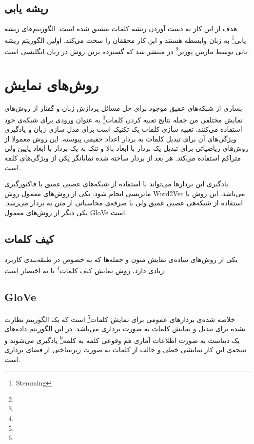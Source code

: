 \documentclass[12pt, a4paper, oneside]{report}
\begin{document}
\subsection{ریشه یابی}

هدف از این کار به دست آوردن ریشه کلمات مشتق شده است. الگوریتم‌های
ریشه یابی\footnote{Stemming}
به زبان وابسطه هستند و این کار محققان را سخت می‌کند. اولین الگوریتم
ریشه یابی
توسط
مارتین پورتر\footnote{}
در
\cite{porter1980algorithm}
منتشر شد که گسترده ترین روش در زبان انگلیسی است\cite{DBLP:journals/corr/AllahyariPASTGK17a}.


\section{روش‌های نمایش}

بساری از شبکه‌های عمیق موجود برای حل مسائل پردازش زبان و گفتار از روش‌های نمایش مختلفی من جمله نتایج
تعبیه کردن کلمات\footnote{}
به عنوان ورودی برای شبکه‌ی خود استفاده می‌کنند.
تعبیه سازی کلمات
یک تکنیک است برای مدل سازی زبان و یادگیری ویژگی‌های آن برای تبدیل کلمات به بردار اعداد حقیقی پیوسته.
این روش معمولا از روش‌های ریاضیاتی برای تبدیل یک بردار با ابعاد بالا و تنک به یک بردار با ابعاد پایین ولی متراکم استفاده می‌کند.
هر بعد از بردار ساخته شده نمایانگر یکی از ویژگی‌های کلمه است.

یادگیری این بردار‌ها می‌تواند با استفاده از شبکه‌های عصبی عمیق یا فاکتورگیری ماتریسی انجام شود. یکی از روش‌های معمول روش‌
Word2Vec
می‌باشد. این روش با استفاده از شبکه‌هی عصبی عمیق ولی با صرفه‌ی محاسباتی از متن به بردار می‌رسد. یکی دیگر از روش‌های معمول
GloVe
است.
\cite{zhang2018deep}

\subsection{کیف کلمات}

یکی از روش‌های ساده‌ی نمایش متون و جمله‌ها که به خصوص در طبقه‌بندی کاربرد زیادی دارد، روش نمایش
کیف کلمات\footnote{}
یا به اختصار
است.

\subsection{GloVe}

خلاصه شده‌ی 
بردارهای عمومی برای نمایش کلمات\footnote{}
است که یک الگوریتم نظارت نشده برای تبدیل و نمایش کلمات به صورت برداری می‌باشد.
در این الگوریتم داده‌های یک دیتاست به صورت اطلاعات آماری 
هم وقوعی کلمه به کلمه\footnote{}
یادگیری می‌شوند و نتیجه‌ی این کار نمایشی خطی و جالب از کلمات
به صورت زیرساختی از فضای برداری است\cite{8844895}.
\end{document}
